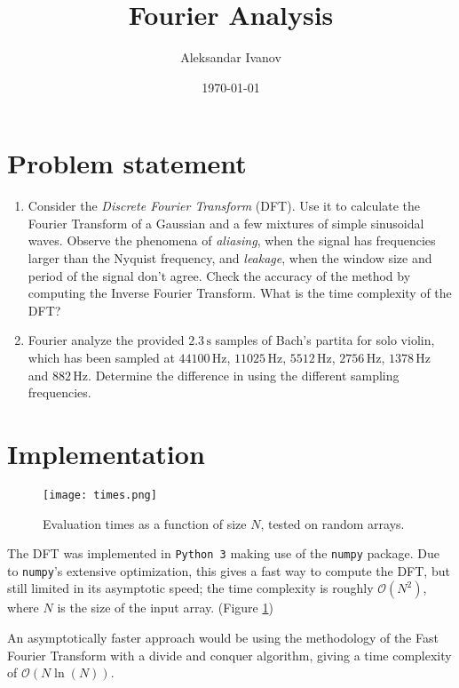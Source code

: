 \documentclass[10pt,a4paper,twocolumn]{article}
\begin{document}
\title{Fourier Analysis}
\author{Aleksandar Ivanov}
\date{\today}
\maketitle


\section{Problem statement}

\begin{enumerate}
\item Consider the \emph{Discrete Fourier Transform} (DFT). Use it to calculate the Fourier Transform of a Gaussian and a few mixtures of simple sinusoidal waves. Observe the phenomena of \emph{aliasing}, when the signal has frequencies larger than the Nyquist frequency, and \emph{leakage}, when the window size and period of the signal don't agree. Check the accuracy of the method by computing the Inverse Fourier Transform. What is the time complexity of the DFT?

\item Fourier analyze the provided $2.3 \,\mathrm{s}$ samples of Bach's partita for solo violin, which has been sampled at $44 100 \,\mathrm{Hz}$, $11 025 \,\mathrm{Hz}$, $5512 \,\mathrm{Hz}$, $2756 \,\mathrm{Hz}$, $1378 \,\mathrm{Hz}$ and $882 \,\mathrm{Hz}$. Determine the difference in using the different sampling frequencies.
\end{enumerate}


\section{Implementation}

\begin{figure}
\centering
\captionsetup{justification=centering}
\texttt{[image: times.png]}
\caption{Evaluation times as a function of size $N$, tested on random arrays.}
\label{fig:times}
\end{figure}

The DFT was implemented in \texttt{Python 3} making use of the \texttt{numpy} package. Due to \texttt{numpy}'s extensive optimization, this gives a fast way to compute the DFT, but still limited in its asymptotic speed; the time complexity is roughly $\mathcal{O} \left( N^2 \right)$, where $N$ is the size of the input array. (Figure \ref{fig:times}) \cite{nlnn}

An asymptotically faster approach would be using the methodology of the Fast Fourier Transform with a divide and conquer algorithm, giving a time complexity of $\mathcal{O} \left( N \ln(N) \right) $. \cite{aliasing}
\end{document}
